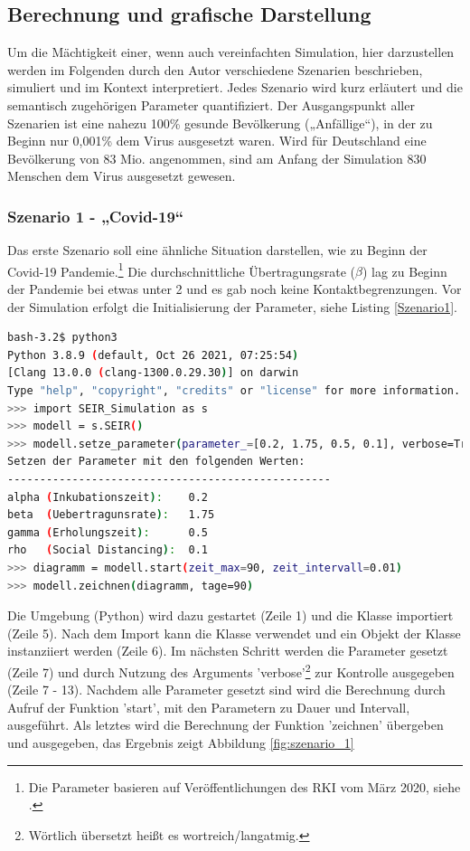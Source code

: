 \documentclass[12pt]{article}
\begin{document}


\subsection{Berechnung und grafische Darstellung}
Um die Mächtigkeit einer, wenn auch vereinfachten Simulation, hier darzustellen werden im Folgenden durch den Autor verschiedene Szenarien beschrieben, simuliert und im Kontext interpretiert. Jedes Szenario wird kurz erläutert und die semantisch zugehörigen Parameter quantifiziert. Der Ausgangspunkt aller Szenarien ist eine nahezu 100\% gesunde Bevölkerung („Anfällige“), in der zu Beginn nur 0,001\% dem Virus ausgesetzt waren. Wird für Deutschland eine Bevölkerung von 83 Mio. angenommen, sind am Anfang der Simulation 830 Menschen dem Virus ausgesetzt gewesen.

\subsubsection{Szenario 1 - „Covid-19“}
Das erste Szenario soll eine ähnliche Situation darstellen, wie zu Beginn der Covid-19 Pandemie.\footnote{Die Parameter basieren auf Veröffentlichungen des RKI vom März 2020, siehe \cite{SEIRParameter}.} Die durchschnittliche Übertragungsrate ($\beta$) lag zu Beginn der Pandemie bei etwas unter 2 und es gab noch keine Kontaktbegrenzungen. Vor der Simulation erfolgt die Initialisierung der Parameter, siehe Listing \ref{Szenario1}.

\begin{lstlisting}[language=Bash, caption=Szenario 1 - Covid-19, label=Szenario1]
bash-3.2$ python3
Python 3.8.9 (default, Oct 26 2021, 07:25:54) 
[Clang 13.0.0 (clang-1300.0.29.30)] on darwin
Type "help", "copyright", "credits" or "license" for more information.
>>> import SEIR_Simulation as s
>>> modell = s.SEIR()
>>> modell.setze_parameter(parameter_=[0.2, 1.75, 0.5, 0.1], verbose=True)
Setzen der Parameter mit den folgenden Werten:
--------------------------------------------------
alpha (Inkubationszeit):    0.2
beta  (Uebertragunsrate):   1.75
gamma (Erholungszeit):      0.5
rho   (Social Distancing):  0.1
>>> diagramm = modell.start(zeit_max=90, zeit_intervall=0.01)
>>> modell.zeichnen(diagramm, tage=90)
\end{lstlisting}

Die Umgebung (Python) wird dazu gestartet (Zeile 1) und die Klasse importiert (Zeile 5). Nach dem Import kann die Klasse verwendet und ein Objekt der Klasse instanziiert werden (Zeile 6). Im nächsten Schritt werden die Parameter gesetzt (Zeile 7) und durch Nutzung des Arguments 'verbose'\footnote{Wörtlich übersetzt heißt es wortreich/langatmig.} zur Kontrolle ausgegeben (Zeile 7 - 13). Nachdem alle Parameter gesetzt sind wird die Berechnung durch Aufruf der Funktion 'start', mit den Parametern zu Dauer und Intervall, ausgeführt. Als letztes wird die Berechnung der Funktion 'zeichnen' übergeben und ausgegeben, das Ergebnis zeigt Abbildung \ref{fig:szenario_1}
\end{document}

